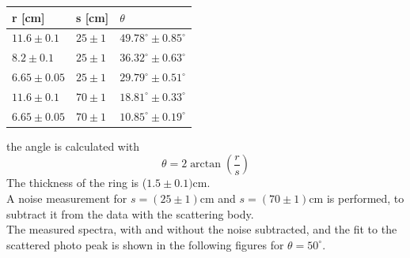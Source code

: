 \documentclass{article}
\begin{document}
\begin{table}[H]
    \centering
    \begin{tabular}{l|l|l}
        r [cm] & s [cm] & $\theta$  \\\hline
        $11.6 \pm 0.1$ & $25 \pm 1$ & $49.78^\circ \pm 0.85^\circ$ \\\hline
        $8.2 \pm 0.1$ & $25 \pm 1$ & $36.32^\circ\pm 0.63^\circ $ \\\hline
        $6.65 \pm 0.05$ & $25 \pm 1$ & $29.79^\circ\pm 0.51^\circ $ \\\hline
        $11.6 \pm 0.1$ & $70 \pm 1$ &  $ 18.81^\circ\pm 0.33^\circ$  \\\hline
        $6.65 \pm 0.05$ & $70 \pm 1$ & $ 10.85^\circ \pm 0.19^\circ$
    \end{tabular}
\end{table}
the angle is calculated with
\begin{equation*}
    \theta = 2\arctan(\frac{r}{s})
\end{equation*}
The thickness of the ring is ($1.5\pm 0.1)$cm.\\
A noise measurement for $s = (25\pm 1)$cm and $s = (70\pm 1)$cm  is performed, to subtract it from the data with the scattering body.\\
The measured spectra, with and without the noise subtracted, and the fit to the scattered photo peak is shown in the following figures for $\theta = 50^\circ$.
\end{document}
